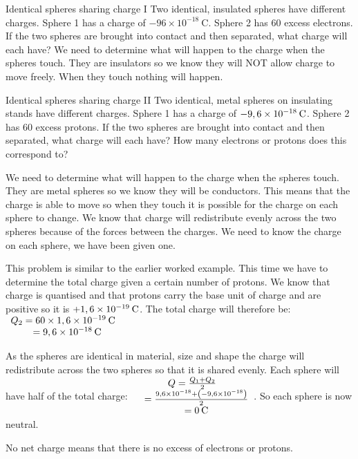 \begin{wex}{Identical spheres sharing charge I}{
 Two identical, insulated spheres have different charges. Sphere 1 has a charge of $-96\ensuremath{\times}{10}^{-18}~\text{C}$. Sphere 2 has 60 excess electrons. If the two spheres are brought into contact and then separated, what charge will each have?}{
         We need to determine what will happen to the charge when the spheres touch. They are insulators so we know they will NOT allow charge to move freely. When they touch nothing will happen. }\end{wex}


    \begin{wex}{Identical spheres sharing charge II}{
 \label{m38781*id1166019825381}Two identical, metal spheres on insulating stands have different charges. Sphere 1 has a charge of $-9,6\ensuremath{\times}{10}^{-18}\phantom{\rule{2pt}{0ex}}\text{C}$. Sphere 2 has 60 excess protons. If the two spheres are brought into contact and then separated, what charge will each have? How many electrons or protons does this correspond to?}{ We need to determine what will happen to the charge when the spheres touch. They are metal spheres so we know they will be conductors. This means that the charge is able to move so when they touch it is possible for the charge on each sphere to change. We know that charge will redistribute evenly across the two spheres because of the forces between the charges. We need to know the charge on each sphere, we have been given one.

This problem is similar to the earlier worked example. This time we have to determine the total charge given a certain number of protons. We know that charge is quantised and that protons carry the base unit of charge and are positive so it is $+1,6\ensuremath{\times}{10}^{-19}\phantom{\rule{2pt}{0ex}}\text{C}$. The total charge will therefore be:\newline
$\begin{array}{ccc}{Q}_{2}=60\ensuremath{\times}1,6\ensuremath{\times}{10}^{-19}\phantom{\rule{2pt}{0ex}}\text{C}\\ \phantom{x}=9,6\ensuremath{\times}{10}^{-18}\phantom{\rule{2pt}{0ex}}\text{C}\end{array}$\par
As the spheres are identical in material, size and shape the charge will redistribute across the two spheres so that it is shared evenly. Each sphere will have half of the total charge:\newline
$\begin{array}{ccc}Q=\frac{{Q}_{1}+{Q}_{2}}{2}\\ \phantom{x}=\frac{9,6\ensuremath{\times}{10}^{-18}+\left(-9,6\ensuremath{\times}{10}^{-18}\right)}{2}\\ \phantom{x}=0\phantom{\rule{2pt}{0ex}}\text{C}\end{array}$.\newline
     So each sphere is now neutral.\par
    No net charge means that there is no excess of electrons or protons.}\end{wex}
    \noindent


